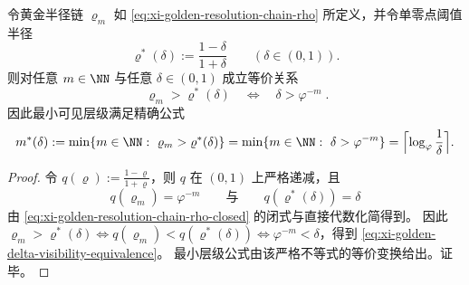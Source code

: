 \begin{proposition}[黄金半径链上的阈值可见性等价]\label{prop:xi-golden-radius-delta-visibility-equivalence}
令黄金半径链 \(\varrho_m\) 如 \eqref{eq:xi-golden-resolution-chain-rho} 所定义，并令单零点阈值半径
\[
\varrho^\ast(\delta):=\frac{1-\delta}{1+\delta}\qquad(\delta\in(0,1)).
\]
则对任意 \(m\in\NN\) 与任意 \(\delta\in(0,1)\) 成立等价关系
\begin{equation}\label{eq:xi-golden-delta-visibility-equivalence}
\boxed{\;
\varrho_m>\varrho^\ast(\delta)\quad\Longleftrightarrow\quad \delta>\varphi^{-m}\; }.
\end{equation}
因此最小可见层级满足精确公式
\[
m^\ast(\delta)
:=\min\{m\in\NN:\ \varrho_m>\varrho^\ast(\delta)\}
=\min\{m\in\NN:\ \delta>\varphi^{-m}\}
=\Bigl\lceil \log_{\varphi}\frac{1}{\delta}\Bigr\rceil .
\]
\end{proposition}
\begin{proof}
令 \(q(\varrho):=\frac{1-\varrho}{1+\varrho}\)，则 \(q\) 在 \((0,1)\) 上严格递减，且
\[
q(\varrho_m)=\varphi^{-m}\qquad\text{与}\qquad q(\varrho^\ast(\delta))=\delta
\]
由 \eqref{eq:xi-golden-resolution-chain-rho-closed} 的闭式与直接代数化简得到。
因此
\(
\varrho_m>\varrho^\ast(\delta)\iff q(\varrho_m)<q(\varrho^\ast(\delta))\iff \varphi^{-m}<\delta
\)，得到 \eqref{eq:xi-golden-delta-visibility-equivalence}。
最小层级公式由该严格不等式的等价变换给出。证毕。
\end{proof}

\endinput

